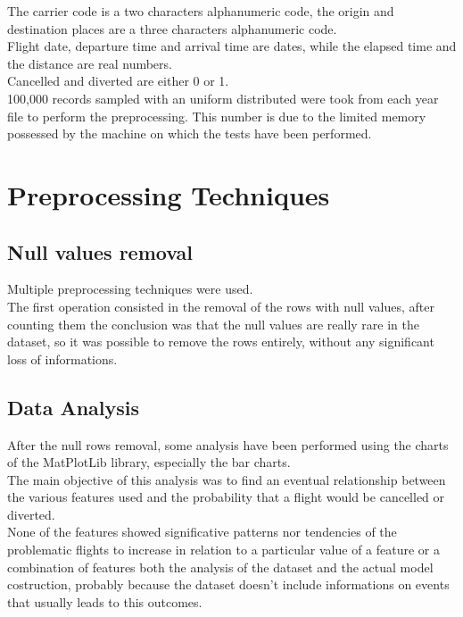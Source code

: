 \documentclass[
	letterpaper, %
	10pt, %
]{class}
\begin{document}
The carrier code is a two characters alphanumeric code, the origin and destination places are a three characters alphanumeric code.\\
Flight date, departure time and arrival time are dates, while the elapsed time and the distance are real numbers.\\
Cancelled and diverted are either 0 or 1.\\

100,000 records sampled with an uniform distributed were took from each year file to perform the preprocessing. This number is due to the limited memory
possessed by the machine on which the tests have been performed.


\section{Preprocessing Techniques}

\subsection{Null values removal}

Multiple preprocessing techniques were used.\\

The first operation consisted in the removal of the rows with null values, after counting them the conclusion was that the null values are really rare in the dataset, so it was possible to remove the rows entirely, without any significant loss of informations.\\

\subsection{Data Analysis}
After the null rows removal, some analysis have been performed using the charts of the MatPlotLib library, especially the bar charts.\\
The main objective of this analysis was to find an eventual relationship between the various features used and the probability that a flight would be cancelled or diverted.\\

None of the features showed significative patterns nor tendencies of the problematic flights to increase in relation to a particular value of a feature or a combination of features both the analysis of the dataset and the actual model costruction, probably because the dataset doesn't include informations on events that usually leads to this outcomes.\\
\end{document}
